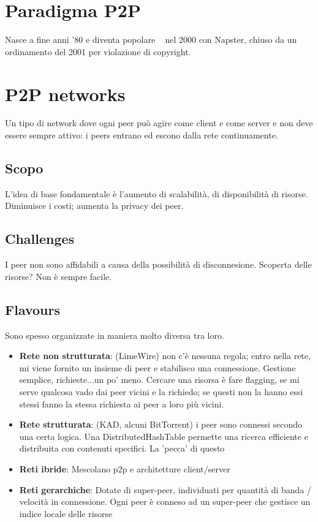 \section{Paradigma P2P}
Nasce a fine anni '80 e diventa popolare ~ nel 2000 con Napster, chiuso da un ordinamento del 2001 per violazione di copyright.\\

\section{P2P networks}
Un tipo di network dove ogni peer può agire come client e come server e non deve essere sempre attivo: i peers entrano ed escono dalla rete continuamente.\\
\subsection{Scopo}
L'idea di base fondamentale è l'aumento di scalabilità, di disponibilità di risorse. 
Diminuisce i costi; aumenta la privacy dei peer.

\subsection{Challenges}
I peer non sono affidabili a causa della possibilità di disconnesione.
Scoperta delle risorse? Non è sempre facile.

\subsection{Flavours}
Sono spesso organizzate in maniera molto diversa tra loro.
\begin{itemize}
\item \textbf{Rete non strutturata}: (LimeWire) non c'è nessuna regola; entro nella rete, mi viene fornito un insieme di peer e stabilisco una connessione. Gestione semplice, richieste...un po' meno. Cercare una risorsa è fare flagging, se mi serve qualcosa vado dai peer vicini e la richiedo; se questi non la hanno essi stessi fanno la stessa richiesta ai peer a loro più vicini.
\item \textbf{Rete strutturata}: (KAD, alcuni BitTorrent) i peer sono connessi secondo una certa logica. Una DistributedHashTable permette una ricerca efficiente e distribuita con contenuti specifici. La 'pecca' di questo 
\item \textbf{Reti ibride}: Mescolano p2p e architetture client/server
\item \textbf{Reti gerarchiche}: Dotate di super-peer, individuati per quantità di banda / velocità in connessione. Ogni peer è conneso ad un super-peer che gestisce un indice locale delle risorse
\end{itemize}

